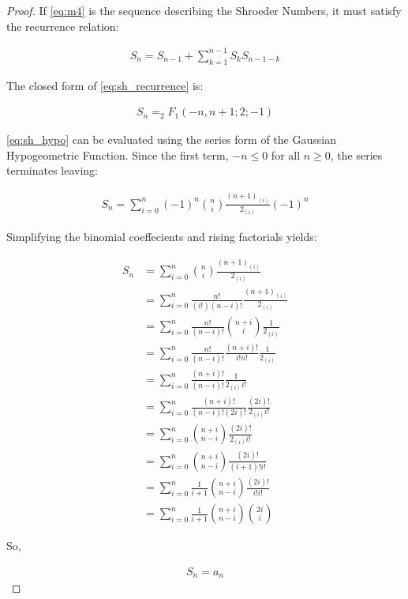 \begin{proof}

If \ref{eq:m4} is the sequence describing the Shroeder Numbers, it must satisfy the recurrence relation:

\begin{gather} \label{eq:sh_recurrence}
    S_n = S_{n-1} + \sum_{k=1}^{n-1} {S_k} {S_{n-1-k}}
\end{gather}

The closed form of \ref{eq:sh_recurrence} is:

\begin{gather} \label{eq:sh_hypo}
    S_n = _{2}F_{1}({-n}, n+1; 2; {-1})
\end{gather}

\ref{eq:sh_hypo} can be evaluated using the series form of the Gaussian Hypogeometric Function. Since the first term, ${-n} \leq 0$ for all $n \geq 0$, the series terminates leaving:

\begin{gather} \label{eq:sh_series}
    S_n = \sum_{i=0}^{n} ({-1})^{n} {{n}\choose{i}} {\frac{(n+1)_{(i)}}{2_{(i)}}} ({-1})^{n}
\end{gather}

Simplifying the binomial coeffecients and rising factorials yields:

\begin{align} \label{eq:sh_series_simple}
    S_n &=  \sum_{i=0}^{n} {{n}\choose{i}} {\frac{(n+1)_{(i)}}{2_{(i)}}} \\
    &= \sum_{i=0}^{n} {\frac{n!}{(i!)(n-i)!}} {\frac{(n+1)_{(i)}}{2_{(i)}}} \\
    &= \sum_{i=0}^{n} {\frac{n!}{(n-i)!}} {{n + i}\choose{i}} {\frac{1}{2_{(i)}}} \\
    &= \sum_{i=0}^{n} {\frac{n!}{(n-i)!}} {\frac{(n+i)!}{i!n!}} {\frac{1}{2_{(i)}}} \\
    &= \sum_{i=0}^{n} {\frac{(n+i)!}{(n-i)!}} {\frac{1}{2_{(i)}{i!}}} \\
    &= \sum_{i=0}^{n} {\frac{(n+i)!}{(n-i)! (2i)!}} {\frac{(2i)!}{2_{(i)}{i!}}} \\
    &= \sum_{i=0}^{n} {{n+i}\choose{n-i}} {\frac{(2i)!}{2_{(i)}{i!}}} \\
    &= \sum_{i=0}^{n} {{n+i}\choose{n-i}} {\frac{(2i)!}{{(i+1)!}{i!}}} \\
    &= \sum_{i=0}^{n} {\frac{1}{i+1}} {{n+i}\choose{n-i}} {\frac{(2i)!}{{i!}{i!}}} \\
    &= \sum_{i=0}^{n} {\frac{1}{i+1}} {{n+i}\choose{n-i}} {{2i}\choose{i}}
\end{align}

So,

\begin{gather*}
    S_n = a_n
\end{gather*}

\end{proof}